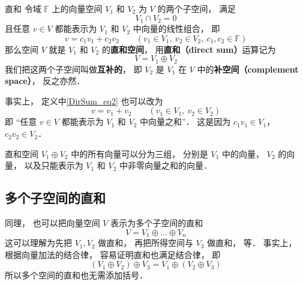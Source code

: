 
\begin{issues}
\issueTODO
{}
\end{issues}

\begin{definition}{直和}\label{DirSum_def1}
令域 $\mathbb F$ 上的向量空间 $V_1$ 和 $V_2$ 为 $V$ 的两个子空间， 满足
\begin{equation}
V_1 \cap V_2 = \qty{0}
\end{equation}
且任意 ${v} \in V$ 都能表示为 $V_1$ 和 $V_2$ 中向量的线性组合， 即
\begin{equation}\label{DirSum_eq2}
{v} = c_1 {v_1} + c_2 {v_2}
\qquad
({v_1} \in V_1,\ {v_2} \in V_2,\ c_1, c_2 \in \mathbb F)
\end{equation}
那么空间 $V$ 就是 $V_1$ 和 $V_2$ 的\textbf{直和空间}， 用\textbf{直和（direct sum）}运算记为
\begin{equation}
V = V_1 \oplus V_2
\end{equation}
我们把这两个子空间叫做\textbf{互补的}， 即 $V_2$ 是 $V_1$ 在 $V$ 中的\textbf{补空间（complement space）}， 反之亦然．
\end{definition}

事实上， 定义中\autoref{DirSum_eq2} 也可以改为
\begin{equation}
{v} = {v_1} + {v_2} \qquad
({v_1} \in V_1,\ {v_2} \in V_2)
\end{equation}
即 “任意 ${v} \in V$ 都能表示为 $V_1$ 和 $V_2$ 中向量之和”． 这是因为 $c_1 v_1 \in V_1$， $c_2 v_2 \in V_2$．

直和空间 $V_1 \oplus V_2$ 中的所有向量可以分为三组， 分别是 $V_1$ 中的向量， $V_2$ 的向量， 以及只能表示为 $V_1$ 和 $V_2$ 中非零向量之和的向量．

\subsection{多个子空间的直和}
同理， 也可以把向量空间 $V$ 表示为多个子空间的直和
\begin{equation}
V = V_1 \oplus \dots \oplus V_n
\end{equation}
这可以理解为先把 $V_1, V_2$ 做直和， 再把所得空间与 $V_3$ 做直和， 等． 事实上， 根据向量加法的结合律， 容易证明直和也满足结合律， 即
\begin{equation}
(V_1 \oplus V_2) \oplus V_3 = V_1 \oplus (V_2 \oplus V_3)
\end{equation}
所以多个空间的直和也无需添加括号．

